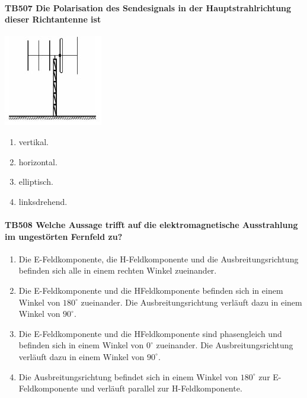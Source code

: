 \documentclass[8pt]{article}
\begin{document}
\begin{enumerate}
\paragraph*{TB507 Die Polarisation des Sendesignals in der Hauptstrahlrichtung dieser Richtantenne ist}
\begin{center}
	\begin{minipage}{\linewidth}
		\centering
		\includegraphics[scale=0.7]{pics/tb507_a.jpg}
	\end{minipage}
\end{center}
\begin{enumerate}[nolistsep,label=\Alph*]
\item vertikal.
\item horizontal.
\item elliptisch.
\item linksdrehend.
\end{enumerate}



\paragraph*{TB508 Welche Aussage trifft auf die elektromagnetische Ausstrahlung im ungestörten Fernfeld zu?}
\begin{enumerate}[nolistsep,label=\Alph*]
\item Die E-Feldkomponente, die H-Feldkomponente und die Ausbreitungsrichtung befinden sich alle in einem rechten Winkel zueinander.
\item Die E-Feldkomponente und die HFeldkomponente befinden sich in einem Winkel von $180^{\circ}$ zueinander. Die Ausbreitungsrichtung verläuft dazu in einem Winkel von $90^{\circ}$.
\item Die E-Feldkomponente und die HFeldkomponente sind phasengleich und befinden sich in einem Winkel von $0^{\circ}$ zueinander. Die Ausbreitungsrichtung verläuft dazu in einem Winkel von $90^{\circ}$.
\item Die Ausbreitungsrichtung befindet sich in einem Winkel von $180^{\circ}$ zur E-Feldkomponente und verläuft parallel zur H-Feldkomponente.
\end{enumerate}




\end{enumerate}
\end{document}
